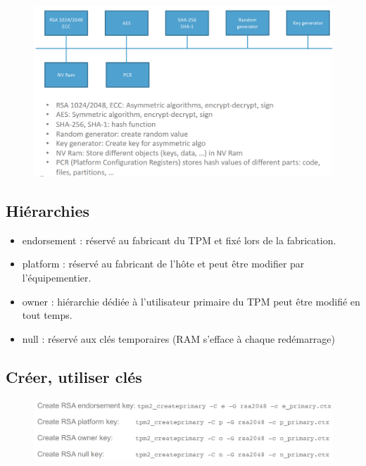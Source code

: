 \documentclass[resume]{subfiles}
\begin{document}
\begin{figure}[H]
    \centering
    \includegraphics[width=\columnwidth]{Figures/TPM/internal.png}
\end{figure}

\subsection{Hiérarchies}
\begin{itemize}
\item endorsement : réservé au fabricant du TPM et fixé lors de la fabrication.
\item platform : réservé au fabricant de l'hôte et peut être modifier par l'équipementier.
\item owner : hiérarchie dédiée à l'utilisateur primaire du TPM peut être modifié en tout temps.
\item null : réservé aux clés temporaires (RAM s'efface à chaque redémarrage)
\end{itemize}

\subsection{Créer, utiliser clés}

\begin{figure}[H]
    \centering
    \includegraphics[width=\columnwidth]{Figures/TPM/createKey.png}
\end{figure}
\end{document}
